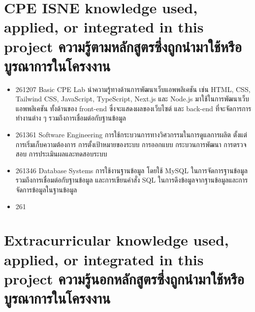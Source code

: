 \section{\ifenglish%
      \ifcpe CPE \else ISNE \fi knowledge used, applied, or integrated in this project
  \else%
      ความรู้ตามหลักสูตรซึ่งถูกนำมาใช้หรือบูรณาการในโครงงาน
  \fi
 }

\begin{itemize}
    \item 261207 Basic CPE Lab นําความรู้ทางด้านการพัฒนาเว็บแอพพลิเคชัน เช่น HTML, CSS, Tailwind CSS, JavaScript, TypeScript, Next.js
          และ Node.js มาใช้ในการพัฒนาเว็บแอพพลิเคชัน ทั้งด้านของ front-end ซึ่งจะแสดงผลของเว็บไซต์ และ back-end ที่จะจัดการการทำงานต่าง ๆ รวมถึงการเชื่อมต่อกับฐานข้อมูล
    \item 261361 Software Engineering การใช้กระบวนการทางวิศวกรรมในการดูแลการผลิต ตั้งแต่การเริ่มเก็บความต้องการ การตั้งเป้าหมายของระบบ การออกแบบ กระบวนการพัฒนา การตรวจสอบ การประเมินผลและทดสอบระบบ
    \item 261346 Database Systems การใช้งานฐานข้อมูล โดยใช้ MySQL ในการจัดการฐานข้อมูล รวมถึงการเชื่อมต่อกับฐานข้อมูล
          และการเขียนคำสั่ง SQL ในการดึงข้อมูลจากฐานข้อมูลและการจัดการข้อมูลในฐานข้อมูล
    \item 261

\end{itemize}


\section{\ifenglish%
      Extracurricular knowledge used, applied, or integrated in this project
  \else%
      ความรู้นอกหลักสูตรซึ่งถูกนำมาใช้หรือบูรณาการในโครงงาน
  \fi
 }


